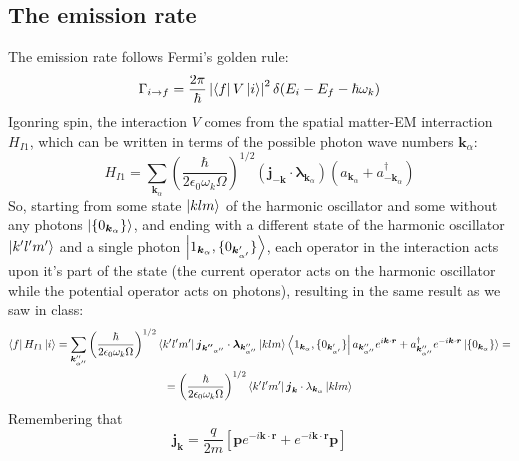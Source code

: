 \documentclass{article}
\begin{document}
\subsection{The emission rate}
The emission rate follows Fermi's golden rule:
\begin{equation}
    \Gamma_{i \rightarrow f} = \frac{2\pi}{\hbar}\left|\bra{f} V \ket{i}\right|^2\delta(E_i - E_f - \hbar \omega_k)
\end{equation}
Igonring spin, the interaction $V$ comes from the spatial matter-EM interraction $H_{I1}$, which can be written in terms of the possible photon wave numbers $\boldsymbol{k}_\alpha$:
\begin{equation}
    H_{I1} = \sum_{\boldsymbol{k}_{\alpha}}
    \left(\frac{\hbar}{2\epsilon_0\omega_k\Omega}\right)^{1/2}
    \left(\boldsymbol{j}_{-\boldsymbol{k}}\cdot\boldsymbol{\lambda}_{\boldsymbol{k}_\alpha}\right)
    \left(a_{\boldsymbol{k}_\alpha} + a^\dagger_{-\boldsymbol{k}_\alpha}\right)
\end{equation}
So, starting from some state $\ket{klm}$ of the harmonic oscillator and some without any photons $\ket{\{0_{\boldsymbol{k}_\alpha}\}}$, and ending with a different state of the harmonic oscillator $\ket{k'l'm'}$ and a single photon $\ket{1_{\boldsymbol{k}_\alpha}, \{0_{\boldsymbol{k}'_{\alpha'}}\}}$, each operator in the interaction acts upon it's part of the state (the current operator acts on the harmonic oscillator while the potential operator acts on photons), resulting in the same result as we saw in class:
\begin{equation}
\begin{gathered}
    \bra{f} H_{I1} \ket{i} = 
    \sum_{\boldsymbol{k}''_{\alpha''}}
    \left(\frac{\hbar}{2\epsilon_0\omega_k\Omega}\right)^{1/2}
    \bra{k'l'm'}\boldsymbol{j}_{\boldsymbol{k''}_{\alpha''}}\cdot\boldsymbol{\lambda}_{\boldsymbol{k}''_{\alpha''}}\ket{klm}
    \bra{1_{\boldsymbol{k}_\alpha}, \{0_{\boldsymbol{k}'_{\alpha'}}\}}
        a_{\boldsymbol{k}''_{\alpha''}}e^{i\boldsymbol{k}\cdot\boldsymbol{r}}
        +
        a^\dagger_{\boldsymbol{k}''_{\alpha''}}e^{-i\boldsymbol{k}\cdot\boldsymbol{r}}
    \ket{\{0_{\boldsymbol{k}_\alpha}\}}
    = \\ =
    \left(\frac{\hbar}{2\epsilon_0\omega_k\Omega}\right)^{1/2}
    \bra{k'l'm'}\boldsymbol{j}_{\boldsymbol{k}}\cdot{\lambda}_{\boldsymbol{k}_{\alpha}}\ket{klm}
\end{gathered}
\end{equation}
Remembering that
\begin{equation}
    \boldsymbol{j}_{\boldsymbol{k}} = \frac{q}{2m}\left[
        \boldsymbol{p}e^{-i\boldsymbol{k}\cdot\boldsymbol{r}}
        + 
        e^{-i\boldsymbol{k}\cdot\boldsymbol{r}}\boldsymbol{p}
    \right]
\end{equation}
\end{document}
